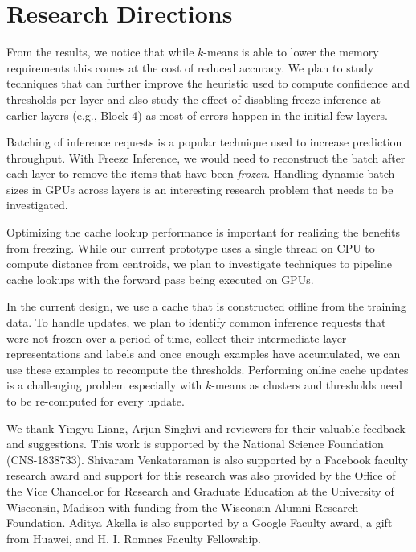 \documentclass[letterpaper,twocolumn,10pt]{article}
\begin{document}
 





\section{Research Directions}\label{sec:disc}
\label{sec:discussion}

 From the results, we notice that while $k$-means is able to lower the memory requirements this comes at the cost of reduced accuracy. We plan to study techniques that can further improve the heuristic used to compute confidence and thresholds per layer and also study the effect of disabling freeze inference at earlier layers (e.g., Block 4) as most of errors happen in the initial few layers.



 Batching of inference requests is a popular technique used to increase prediction throughput. With Freeze Inference, we would need to reconstruct the batch after each layer to remove the items that have been \emph{frozen}. Handling dynamic batch sizes in GPUs across layers is an interesting research problem that needs to be investigated.

 Optimizing the cache lookup performance is important for realizing the benefits from freezing. While our current prototype uses a single thread on CPU to compute distance from centroids, we plan to investigate techniques to pipeline cache lookups with the forward pass being executed on GPUs.



 In the current design, we use a cache that is constructed offline from the training data. To handle updates, we plan to identify common inference requests that were not frozen over a period of time, collect their intermediate layer representations and labels and once enough examples have accumulated, we can use these examples to recompute the thresholds. Performing online cache updates is a challenging problem especially with $k$-means as clusters and thresholds need to be re-computed for every update.

\vspace{0.2cm}

 We thank Yingyu Liang, Arjun Singhvi and reviewers for their valuable feedback and suggestions. This work is supported by the National Science Foundation (CNS-1838733). Shivaram Venkataraman is also supported by a Facebook faculty research award and support for this research was also provided by the Office of the Vice Chancellor for Research and Graduate Education at the University of Wisconsin, Madison with funding from the Wisconsin Alumni Research Foundation. Aditya Akella is also supported by a Google Faculty award, a gift from Huawei, and H. I. Romnes Faculty Fellowship.
\end{document}
